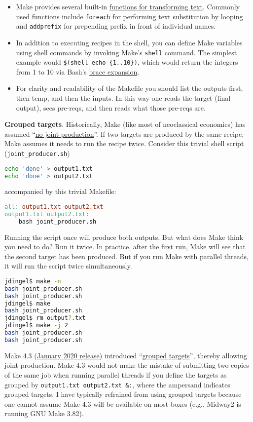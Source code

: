 \begin{itemize}
\item Make provides several built-in \href{https://www.gnu.org/software/make/manual/html_node/Functions.html\#Functions}{functions for transforming text}.
Commonly used functions include \texttt{foreach} for performing text substitution by looping
and \texttt{addprefix} for prepending prefix in front of individual names.
\item In addition to executing recipes in the shell, you can define Make variables using shell commands by invoking Make's \texttt{shell} command.
The simplest example would \texttt{\$(shell echo \{1..10\})}, which would return the integers from 1 to 10 via Bash's \href{https://www.shell-tips.com/bash/seq-brace-expansion/}{brace expansion}.
\item For clarity and readability of the Makefile you should list the outputs first, then temp, and then the inputs.
In this way one reads the target (final output), sees pre-reqs, and then reads what those pre-reqs are.
\end{itemize}

\textbf{Grouped targets}.
Historically, Make (like most of neoclassical economics) has assumed 
``\href{https://doi.org/10.2307/2525367}{no joint production}''.
If two targets are produced by the same recipe, Make assumes it needs to run the recipe twice.
Consider this trivial shell script (\texttt{joint\_producer.sh})
\begin{lstlisting}[language=bash]
echo 'done' > output1.txt
echo 'done' > output2.txt
\end{lstlisting}
accompanied by this trivial Makefile:
\begin{lstlisting}[language=make]
all: output1.txt output2.txt
output1.txt output2.txt:
	bash joint_producer.sh
\end{lstlisting}
Running the script once will produce both outputs.
But what does Make think you need to do? Run it twice.
In practice, after the first run, Make will see that the second target has been produced.
But if you run Make with parallel threads, it will run the script twice simultaneously.
\begin{lstlisting}[language=bash]
jdingel$ make -n
bash joint_producer.sh
bash joint_producer.sh
jdingel$ make
bash joint_producer.sh
jdingel$ rm output?.txt
jdingel$ make -j 2
bash joint_producer.sh
bash joint_producer.sh
\end{lstlisting}
Make 4.3 (\href{https://lwn.net/Articles/810071/}{January 2020 release}) introduced
``\href{https://www.gnu.org/software/make/manual/html_node/Multiple-Targets.html}{grouped targets}'',
thereby allowing joint production.
Make 4.3 would not make the mistake of submitting two copies of the same job when running parallel threads if you define the targets as grouped by \texttt{output1.txt output2.txt \&:},
where the ampersand indicates grouped targets.
I have typically refrained from using grouped targets because one cannot assume Make 4.3 will be available on most boxes (e.g., Midway2 is running GNU Make 3.82).


